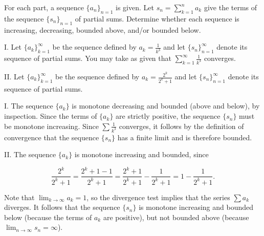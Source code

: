 \documentclass[noauthor]{ximera}
\begin{document}
\begin{problem}
For each part, a sequence $\{a_n\}_{n=1}$ is given.  Let $s_n = \sum_{k=1}^n a_k$ give the terms of the sequence $\{s_n\}_{n=1}$ of partial sums. Determine whether each sequence is increasing, decreasing, bounded above, and/or bounded below. 

I. Let $\{a_k\}_{k=1}^\infty$ be the sequence defined by $a_k = \frac{1}{k^3}$ and let $\{s_n\}_{n=1}^\infty$ denote its sequence of partial sums. You may take as given that $\sum_{k=1}^{\infty} \frac{1}{k^3}$ converges.

II. Let $\{a_k\}_{k=1}^\infty$ be the sequence defined by $a_k = \frac{2^k}{2^k +1}$ and let $\{s_n\}_{n=1}^\infty$ denote its sequence of partial sums.  

\begin{freeResponse}
I. The sequence $\{a_k\}$ is monotone decreasing and bounded (above and below), by inspection. Since the terms of $\{a_k\}$ are strictly positive, the sequence $\{s_n\}$ must be monotone increasing. Since $\sum \frac{1}{k^3}$ converges, it follows by the definition of convergence that the sequence $\{s_n\}$ has a finite limit and is therefore bounded.

II. The sequence $\{a_k\}$ is monotone increasing and bounded, since

\[
\frac{2^k}{2^k +1} = \frac{2^k+1 -1}{2^k +1} = \frac{2^k+1}{2^k +1}- \frac{1}{2^k +1} = 1 - \frac{1}{2^k +1}.
\]

Note that $\lim_{k\rightarrow \infty} a_k = 1$, so the divergence test implies that the series $\sum a_k$ diverges. It follows that the sequence $\{s_n\}$ is monotone increasing and bounded below (because the terms of $a_k$ are positive), but not bounded above (because $\lim_{n \rightarrow \infty} s_n = \infty$). 
\end{freeResponse}

\end{problem}
\end{document}
